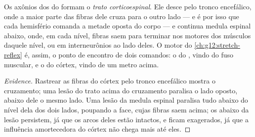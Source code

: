 \begin{proposition}\label{prop:g12:brain-and-movement:pathway}
Os axônios dos  do  formam o \emph{trato
corticoespinal}. Ele desce pelo tronco
encefálico, onde a maior parte das fibras dele cruza para o outro lado
--- e é por isso que cada hemisfério comanda a metade oposta do corpo
--- e continua medula espinal abaixo, onde, em cada nível, fibras saem
para terminar nos  motores dos músculos daquele nível, ou em
interneurônios ao lado deles. O  motor do
\cref{ch:g12:stretch-reflex} é, assim, o ponto de encontro de dois
comandos: o do , vindo do fuso muscular, e o do córtex,
vindo de um metro acima.
\end{proposition}
\begin{proof}[Evidence]
Rastrear as fibras do córtex pelo tronco encefálico mostra o
cruzamento; uma lesão do trato acima do cruzamento paralisa o lado
oposto, abaixo dele o mesmo lado. Uma lesão da medula espinal paralisa
tudo abaixo do nível dela dos dois lados, poupando a face, cujas fibras
saem acima; os  abaixo da lesão persistem, já que os arcos
deles estão intactos, e ficam exagerados, já que a influência
amortecedora do córtex não chega mais até eles.
\end{proof}

